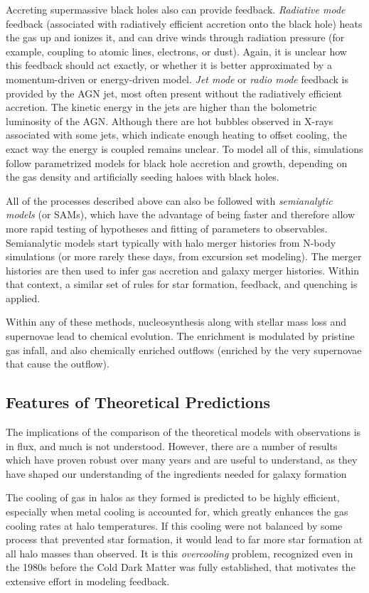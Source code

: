 Accreting supermassive black holes also can provide feedback. {\it
Radiative mode} feedback (associated with radiatively efficient
accretion onto the black hole) heats the gas up and ionizes it, and
can drive winds through radiation pressure (for example, coupling to
atomic lines, electrons, or dust).  Again, it is unclear how this
feedback should act exactly, or whether it is better approximated by a
momentum-driven or energy-driven model. {\it Jet mode} or {\it radio
mode} feedback is provided by the AGN jet, most often present without
the radiatively efficient accretion. The kinetic energy in the jets
are higher than the bolometric luminosity of the AGN. Although there
are hot bubbles observed in X-rays associated with some jets, which
indicate enough heating to offset cooling, the exact way the energy is
coupled remains unclear. To model all of this, simulations follow
parametrized models for black hole accretion and growth, depending on
the gas density and artificially seeding haloes with black holes.

All of the processes described above can also be followed with {\it
semianalytic models} (or SAMs), which have the advantage of being
faster and therefore allow more rapid testing of hypotheses and
fitting of parameters to observables. Semianalytic models start
typically with halo merger histories from N-body simulations (or more
rarely these days, from excursion set modeling). The merger histories
are then used to infer gas accretion and galaxy merger
histories. Within that context, a similar set of rules for star
formation, feedback, and quenching is applied.

Within any of these methods, nucleosynthesis along with stellar mass
loss and supernovae lead to chemical evolution. The enrichment is
modulated by pristine gas infall, and also chemically enriched
outflows (enriched by the very supernovae that cause the outflow).

\subsection{Features of Theoretical Predictions}

The implications of the comparison of the theoretical models with
observations is in flux, and much is not understood. However, there
are a number of results which have proven robust over many years and
are useful to understand, as they have shaped our understanding of the
ingredients needed for galaxy formation

The cooling of gas in halos as they formed is predicted to be highly
efficient, especially when metal cooling is accounted for, which
greatly enhances the gas cooling rates at halo temperatures. If this
cooling were not balanced by some process that prevented star
formation, it would lead to far more star formation at all halo masses
than observed. It is this {\it overcooling} problem, recognized even
in the 1980s before the Cold Dark Matter was fully established, that
motivates the extensive effort in modeling feedback.

